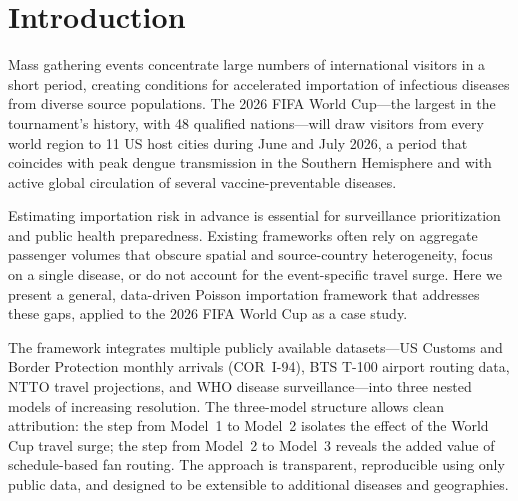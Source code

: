 \documentclass[12pt]{article}
\begin{document}
\begin{abstract}
\medskip
\noindent\textbf{Conclusions.}
This Poisson importation framework, built entirely from publicly
available data, provides reproducible importation risk estimates for
mass gathering events. The diaspora extension reveals that the
social environment an imported case enters---not just the arrival
volume---shapes local transmission potential, and identifies cities
at secondary risk through diaspora return travel that would be
invisible to conventional importation models. The framework extends
to additional diseases, cities, and gatherings, offering a transparent
baseline complementary to proprietary modeling systems.
\end{abstract}

\section*{Introduction}

Mass gathering events concentrate large numbers of international
visitors in a short period, creating conditions for accelerated
importation of infectious diseases from diverse source populations.
The 2026 FIFA World Cup---the largest in the tournament's history,
with 48 qualified nations---will draw visitors from every world
region to 11 US host cities during June and July 2026, a period
that coincides with peak dengue transmission in the Southern
Hemisphere and with active global circulation of several
vaccine-preventable diseases.

Estimating importation risk in advance is essential for surveillance
prioritization and public health preparedness. Existing frameworks
often rely on aggregate passenger volumes that obscure spatial and
source-country heterogeneity, focus on a single disease, or do not
account for the event-specific travel surge. Here we present a
general, data-driven Poisson importation framework that addresses
these gaps, applied to the 2026 FIFA World Cup as a case study.

The framework integrates multiple publicly available datasets---US
Customs and Border Protection monthly arrivals (COR~I-94), BTS T-100
airport routing data, NTTO travel projections, and WHO disease
surveillance---into three nested models of increasing resolution. The
three-model structure allows clean attribution: the step from Model~1
to Model~2 isolates the effect of the World Cup travel surge; the
step from Model~2 to Model~3 reveals the added value of
schedule-based fan routing. The approach is transparent, reproducible
using only public data, and designed to be extensible to additional
diseases and geographies.
\end{document}
